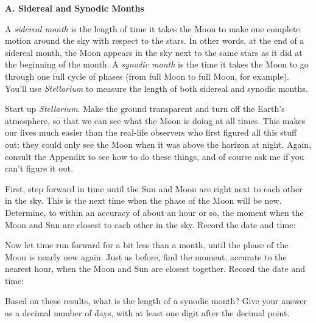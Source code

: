 




\bigskip

{\bf A. Sidereal and Synodic Months}

A {\it sidereal month} is the length of time it takes the
Moon to make one complete motion around the sky with respect to the
stars.  In other words, at the end of a sidereal month, the Moon
appears in the sky next to the same stars as it did at the beginning
of the month.
A {\it synodic month} is the time it takes the Moon to go through one
full cycle of phases (from full Moon to full Moon, for example).
You'll use {\it Stellarium} to measure the length of both sidereal and
synodic months.

Start up {\it Stellarium}.  Make the ground transparent and turn
off the Earth's atmosphere, so that we can see what the Moon
is doing at all times. This makes our lives much easier
than the real-life observers who first figured all this stuff out:
they could only see the Moon when it was above the horizon at night.
Again, consult the Appendix to see how to do these things, and of course
ask me if you can't figure it out.

First, step forward in time until the Sun and Moon are right
next to each other in the sky. This is the next time when
the phase of the Moon will be new.
Determine, to within an accuracy of about an hour or so, the
moment when the Moon and Sun are closest to each other in
the sky.
Record the date and time:

\vskip 1in

Now let time run forward for a bit less than a month, until the phase of the Moon is nearly new
again.  Just as before, find the moment, accurate to the nearest hour,
when the Moon and Sun are closest together.  Record the date and time:

\vskip 1in

Based on these results, what is the length of a synodic month?
Give your answer as a decimal number of days, with at least
one digit after the decimal point.

